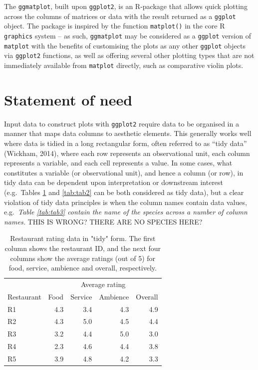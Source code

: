 \documentclass[10pt,a4paper,onecolumn]{article}
\begin{document}
The \texttt{ggmatplot}, built upon \texttt{ggplot2}, is an R-package
that allows quick plotting across the columns of matrices or data with
the result returned as a \texttt{ggplot} object. The package is inspired
by the function \texttt{matplot()} in the core R \texttt{graphics}
system -- as such, \texttt{ggmatplot} may be considered as a
\texttt{ggplot} version of \texttt{matplot} with the benefits of
customising the plots as any other \texttt{ggplot} objects via
\texttt{ggplot2} functions, as well as offering several other plotting
types that are not immediately available from \texttt{matplot} directly,
such as comparative violin plots.

\hypertarget{statement-of-need}{%
\section{Statement of need}\label{statement-of-need}}

Input data to construct plots with \texttt{ggplot2} require data to be
organised in a manner that maps data columns to aesthetic elements. This
generally works well where data is tidied in a long rectangular form,
often referred to as ``tidy data'' (Wickham, 2014), where each row
represents an observational unit, each column represents a variable, and
each cell represents a value. In some cases, what constitutes a variable
(or observational unit), and hence a column (or row), in tidy data can
be dependent upon interpretation or downstream interest (e.g.~Tables
\ref{tab:tab1} and \ref{tab:tab2} can be both considered as tidy data),
but a clear violation of tidy data principles is when the column names
contain data values, e.g.~\emph{Table \ref{tab:tab3} contain the name of
the species across a number of column names.} THIS IS WRONG? THERE ARE
NO SPECIES HERE?

\begin{table}

\caption{\label{tab:tab1}Restaurant rating data in "tidy" form. The first column shows the restaurant ID, and the next four columns show the average ratings (out of 5) for food, service, ambience and overall, respectively.}
\centering
\begin{tabular}[t]{lrrrr}
\toprule
\multicolumn{1}{c}{ } & \multicolumn{4}{c}{Average rating} \\
\cmidrule(l{3pt}r{3pt}){2-5}
Restaurant & Food & Service & Ambience & Overall\\
\midrule
R1 & 4.3 & 3.4 & 4.3 & 4.9\\
R2 & 4.3 & 5.0 & 4.5 & 4.4\\
R3 & 3.2 & 4.4 & 5.0 & 3.0\\
R4 & 2.3 & 4.6 & 4.4 & 3.8\\
R5 & 3.9 & 4.8 & 4.2 & 3.3\\
\bottomrule
\end{tabular}
\end{table}
\end{document}
